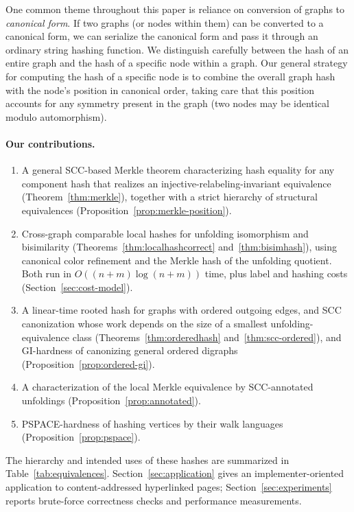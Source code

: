 \documentclass[twoside,leqno]{article}
\begin{document}
One common theme throughout this paper is reliance on conversion of graphs to \textit{canonical form}. If two graphs (or nodes within them) can be converted to a canonical form, we can serialize the canonical form and pass it through an ordinary string hashing function. We distinguish carefully between the hash of an entire graph and the hash of a specific node within a graph. Our general strategy for computing the hash of a specific node is to combine the overall graph hash with the node's position in canonical order, taking care that this position accounts for any symmetry present in the graph (two nodes may be identical modulo automorphism).

\paragraph{Our contributions.}
\begin{enumerate}[leftmargin=*,nosep]
  \item A general SCC-based Merkle theorem characterizing hash equality for any component hash that realizes an injective-relabeling-invariant equivalence (Theorem~\ref{thm:merkle}), together with a strict hierarchy of structural equivalences (Proposition~\ref{prop:merkle-position}).
  \item Cross-graph comparable local hashes for unfolding isomorphism and bisimilarity (Theorems~\ref{thm:localhashcorrect} and~\ref{thm:bisimhash}), using canonical color refinement \cite{berkholz2017tight} and the Merkle hash of the unfolding quotient. Both run in $O((n+m)\log(n+m))$ time, plus label and hashing costs (Section~\ref{sec:cost-model}).
  \item A linear-time rooted hash for graphs with ordered outgoing edges, and SCC canonization whose work depends on the size of a smallest unfolding-equivalence class (Theorems~\ref{thm:orderedhash} and~\ref{thm:scc-ordered}), and GI-hardness of canonizing general ordered digraphs (Proposition~\ref{prop:ordered-gi}).
  \item A characterization of the local Merkle equivalence by SCC-annotated unfoldings (Proposition~\ref{prop:annotated}).
  \item PSPACE-hardness of hashing vertices by their walk languages (Proposition~\ref{prop:pspace}).
\end{enumerate}
The hierarchy and intended uses of these hashes are summarized in Table~\ref{tab:equivalences}. Section~\ref{sec:application} gives an implementer-oriented application to content-addressed hyperlinked pages; Section~\ref{sec:experiments} reports brute-force correctness checks and performance measurements.
\end{document}
